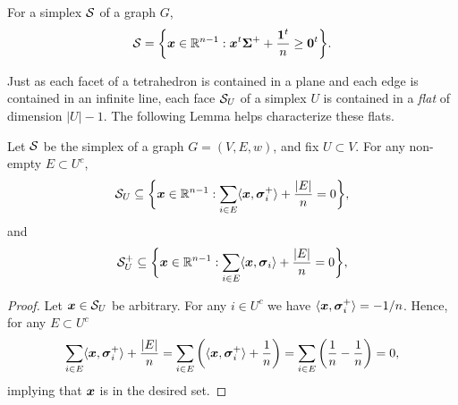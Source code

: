 \begin{lemma}
\label{lem:S_alt_desc}
For a simplex $\mathcal{S}$ of a graph $G$, 
\begin{equation}
\label{eq:S_alt_desc}
    \mathcal{S}=\bigg\{\vb*{x}\in \mathbb{R}^{n-1}:\vb*{x}^t\boldsymbol{\Sigma}^++\frac{\vb{1}^t}{n}\geq \vb{0}^t\bigg\}.
\end{equation}
\end{lemma}

Just as each facet of a tetrahedron is contained in a plane and each edge is contained in an infinite line, each face $\mathcal{S}_U$ of a simplex $U$ is contained in a \emph{flat}  of dimension $|U|-1$. The following Lemma helps characterize these flats. 

\begin{lemma}
\label{lem:SUsubset}
Let $\mathcal{S}$ be the simplex of a graph $G=(V,E,w)$, and fix $U\subset V$. For any non-empty $E\subset U^c$,
\begin{equation*}
    \mathcal{S}_U \subseteq \bigg\{\vb*{x}\in\mathbb{R}^{n-1}: \sum_{i\in E}\langle \vb*{x},\vb*{\sigma}_i^+\rangle +\frac{|E|}{n}=  0\bigg\},
\end{equation*}
and
\begin{equation*}
    \mathcal{S}^+_U \subseteq \bigg\{\vb*{x}\in\mathbb{R}^{n-1}: \sum_{i\in E}\langle \vb*{x},\vb*{\sigma}_i\rangle +\frac{|E|}{n}=  0\bigg\},
\end{equation*}
\end{lemma}
\begin{proof}
Let $\vb*{x}\in\mathcal{S}_U$ be arbitrary. For any $i\in U^c$ we have $\langle \vb*{x},\vb*{\sigma}_i^+\rangle = -1/n$. Hence, for any $E\subset U^c$
\[\sum_{i\in E}\langle \vb*{x},\vb*{\sigma}_i^+\rangle + \frac{|E|}{n} = \sum_{i\in E}\bigg(\langle \vb*{x},\vb*{\sigma}_i^+\rangle+\frac{1}{n}\bigg)=\sum_{i\in E}\bigg(\frac{1}{n}-\frac{1}{n}\bigg)=0,\]
implying that $\vb*{x}$ is in the desired set. 
\end{proof}


